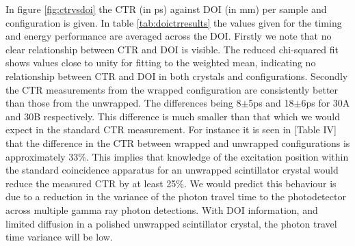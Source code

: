 In figure \ref{fig:ctrvsdoi} the CTR (in ps) against DOI (in mm) per sample and configuration is given. In table \ref{tab:doictrresults} the values given for the timing and energy performance are averaged across the DOI. Firstly we note that no clear relationship between CTR and DOI is visible. The reduced chi-squared fit shows values close to unity for fitting to the weighted mean, indicating no relationship between CTR and DOI in both crystals and configurations. Secondly the CTR measurements from the wrapped configuration are consistently better than those from the unwrapped. The differences being 8$\pm$5ps and 18$\pm$6ps for 30A and 30B respectively. This difference is much smaller than that which we would expect in the standard CTR measurement. For instance it is seen in [Table IV]\cite{r_Paganoni_Pauwels_et_al__2011} that the difference in the CTR between wrapped and unwrapped configurations is approximately 33\%. This implies that knowledge of the excitation position within the standard coincidence apparatus for an unwrapped scintillator crystal would reduce the measured CTR by at least 25\%. We would predict this behaviour is due to a reduction in the variance of the photon travel time  to the photodetector across multiple gamma ray photon detections. With DOI information, and limited diffusion in a polished unwrapped scintillator crystal, the photon travel time variance will be low.

